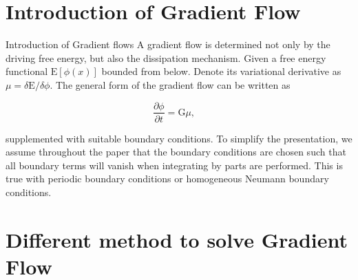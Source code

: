 \documentclass{beamer}
\begin{document}
\section{Introduction of Gradient Flow}
    \begin{frame}{Introduction of Gradient flows}
        A gradient flow is determined not only by the driving free energy, but also the dissipation mechanism. Given a free energy functional $\mathrm{E}[\phi(x)]$ bounded from below. Denote its variational derivative as $\mu=\delta\mathrm{E}/\delta \phi$. The general form of the gradient flow can be written as

\begin{equation}\label{GFlow}
  \frac{\partial\phi}{\partial t} = \mathrm{G}\mu ,\quad
\end{equation}

        supplemented with suitable boundary conditions. To simplify the presentation, we assume throughout the paper that the boundary conditions are chosen such that all boundary terms will vanish when integrating by parts are performed. This is true with periodic boundary conditions or homogeneous Neumann boundary conditions.

    \end{frame}

\section{Different method to solve Gradient Flow}
\end{document}
